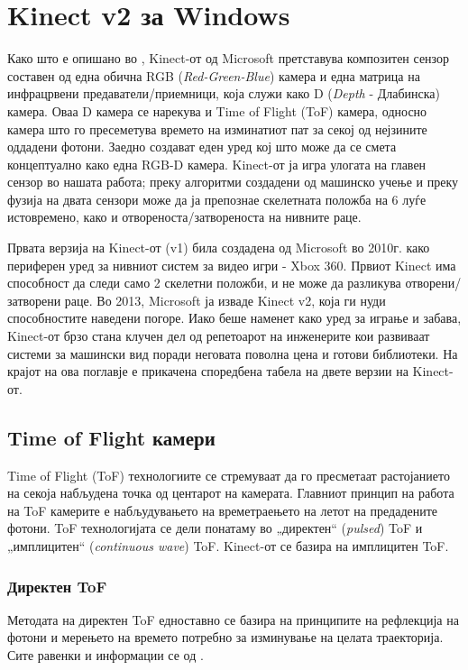 \documentclass[12pt]{article}
\begin{document}
\newpage

\section{Kinect v2 за Windows}
	Како што е опишано во \cite{wassenmuller}, Kinect-от од Microsoft претставува композитен сензор составен од една обична RGB (\textit{Red-Green-Blue}) камера и една матрица на инфрацрвени предаватели/приемници, која служи како D (\textit{Depth} - Длабинска) камера. Оваа D камера се нарекува и Time of Flight (ToF) камера, односно камера што го пресеметува времето на изминатиот пат за секој од нејзините оддадени фотони. Заедно создават еден уред кој што може да се смета концептуално како една RGB-D камера. Kinect-от ја игра улогата на главен сензор во нашата работа; преку алгоритми создадени од машинско учење и преку фузија на двата сензори може да ја препознае скелетната положба на 6 луѓе истовремено, како и отвореноста/затвореноста на нивните раце.

	Првата верзија на Kinect-от (v1) била создадена од Microsoft во 2010г. како периферен уред за нивниот систем за видео игри - Xbox 360. Првиот Kinect има способност да следи само 2 скелетни положби, и не може да разликува отворени/затворени раце. Во 2013, Microsoft ја изваде Kinect v2, која ги нуди способностите наведени погоре. Иако беше наменет како уред за играње и забава, Kinect-от брзо стана клучен дел од репетоарот на инженерите кои развиваат системи за машински вид поради неговата поволна цена и готови библиотеки. На крајот на ова поглавје е прикачена споредбена табела на двете верзии на Kinect-от.
  \subsection{Time of Flight камери}
  	Time of Flight (ToF) технологиите се стремуваат да го пресметаат растојанието на секоја набљудена точка од центарот на камерата. Главниот принцип на работа на ToF камерите е набљудувањето на времетраењето на летот на предадените фотони. ToF технологијата се дели понатаму во „директен“ (\textit{pulsed}) ToF и „имплицитен“ (\textit{continuous wave}) ToF\cite{tofwhitepaper}. Kinect-от се базира на имплицитен ToF.

	   \subsubsection{Директен ToF}
		Методата на директен ToF едноставно се базира на принципите на рефлекција на фотони и мерењето на времето потребно за изминување на целата траекторија. Сите равенки и информации се од \cite{tofwhitepaper}.
\end{document}
